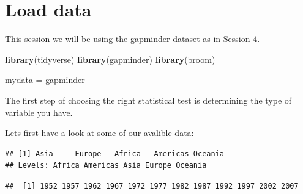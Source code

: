 \documentclass[]{book}
\makeatletter
\newenvironment{Shaded}{\begin{snugshade}}{\end{snugshade}}
\newcommand{\KeywordTok}[1]{\textcolor[rgb]{0.13,0.29,0.53}{\textbf{#1}}}
\newcommand{\StringTok}[1]{\textcolor[rgb]{0.31,0.60,0.02}{#1}}
\newcommand{\CommentTok}[1]{\textcolor[rgb]{0.56,0.35,0.01}{\textit{#1}}}
\newcommand{\OperatorTok}[1]{\textcolor[rgb]{0.81,0.36,0.00}{\textbf{#1}}}
\newcommand{\NormalTok}[1]{#1}
\newenvironment{kframe}{%
\medskip{}
\setlength{\fboxsep}{.8em}
 \def\at@end@of@kframe{}%
 \ifinner\ifhmode%
  \def\at@end@of@kframe{\end{minipage}}%
  \begin{minipage}{\columnwidth}%
 \fi\fi%
 \def\FrameCommand##1{\hskip\@totalleftmargin \hskip-\fboxsep
 \colorbox{shadecolor}{##1}\hskip-\fboxsep
     \hskip-\linewidth \hskip-\@totalleftmargin \hskip\columnwidth}%
 \MakeFramed {\advance\hsize-\width
   \@totalleftmargin\z@ \linewidth\hsize
   \@setminipage}}%
 {\par\unskip\endMakeFramed%
 \at@end@of@kframe}
\renewenvironment{Shaded}{\begin{kframe}}{\end{kframe}}
\makeatother
\begin{document}
\section{Load data}\label{load-data}

This session we will be using the gapminder dataset as in Session 4.

\begin{Shaded}
\begin{Highlighting}[]
\KeywordTok{library}\NormalTok{(tidyverse) }
\KeywordTok{library}\NormalTok{(gapminder)}
\KeywordTok{library}\NormalTok{(broom)}

\NormalTok{mydata =}\StringTok{ }\NormalTok{gapminder}
\end{Highlighting}
\end{Shaded}

The first step of choosing the right statistical test is determining the
type of variable you have.

Lets first have a look at some of our avalible data:

\begin{Shaded}
\end{Shaded}

\begin{verbatim}
## [1] Asia     Europe   Africa   Americas Oceania 
## Levels: Africa Americas Asia Europe Oceania
\end{verbatim}

\begin{Shaded}
\end{Shaded}

\begin{verbatim}
##  [1] 1952 1957 1962 1967 1972 1977 1982 1987 1992 1997 2002 2007
\end{verbatim}

\begin{Shaded}
\end{Shaded}
\end{document}
